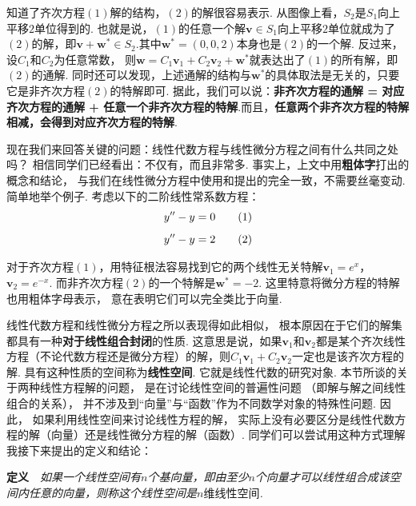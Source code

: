 知道了齐次方程$(1)$解的结构，$(2)$的解很容易表示.
从图像上看，$S_2$是$S_1$向上平移$2$单位得到的.
也就是说，$(1)$的任意一个解$\bm{v} \in S_1$向上平移$2$单位就成为了$(2)$的解，即$\bm{v} + \bm{w^{*}} \in S_2$.其中$\bm{w^{*}}=(0,0,2)$本身也是$(2)$的一个解.
反过来，设$C_1$和$C_2$为任意常数，
则$\bm{w} = C_1 \bm{v}_1 + C_2 \bm{v}_2 + \bm{w^{*}}$就表达出了$(1)$的所有解，即$(2)$的通解.
同时还可以发现，上述通解的结构与$\bm{w^{*}}$的具体取法是无关的，只要它是非齐次方程$(2)$的特解即可.
据此，我们可以说：\textbf{非齐次方程的通解 = 对应齐次方程的通解 + 任意一个非齐次方程的特解}.而且，\textbf{任意两个非齐次方程的特解相减，会得到对应齐次方程的特解}.\vspace{0.5em}

现在我们来回答关键的问题：线性代数方程与线性微分方程之间有什么共同之处吗？
相信同学们已经看出：不仅有，而且非常多.
事实上，上文中用\textbf{粗体字}打出的概念和结论，
与我们在线性微分方程中使用和提出的完全一致，不需要丝毫变动.
简单地举个例子. 考虑以下的二阶线性常系数方程：
\begin{equation}
    \setlength\abovedisplayskip{4pt}
    \setlength\belowdisplayskip{2pt}
    y'' - y = 0  \tag{1}
\end{equation}
\begin{equation}
    \setlength\abovedisplayskip{2pt}
    \setlength\belowdisplayskip{4pt}
    y'' - y = 2  \tag{2}
\end{equation}

对于齐次方程$(1)$，用特征根法容易找到它的两个线性无关特解$\bm{v}_1 = e^x$，$\bm{v}_2 = e^{-x}$.
而非齐次方程$(2)$的一个特解是$\bm{w^{*}} = -2$.
这里特意将微分方程的特解也用粗体字母表示，
意在表明它们可以完全类比于向量.

线性代数方程和线性微分方程之所以表现得如此相似，
根本原因在于它们的解集都具有一种\textbf{对于线性组合封闭}的性质.
这意思是说，如果$\bm{v}_1$和$\bm{v}_2$都是某个齐次线性方程（不论代数方程还是微分方程）的解，则$C_1 \bm{v}_1 + C_2 \bm{v}_2$一定也是该齐次方程的解.
具有这种性质的空间称为\textbf{线性空间}.
它就是线性代数的研究对象.
本节所谈的关于两种线性方程解的问题，
是在讨论线性空间的普遍性问题
（即解与解之间线性组合的关系），
并不涉及到“向量”与“函数”作为不同数学对象的特殊性问题.
因此，
如果利用线性空间来讨论线性方程的解，
实际上没有必要区分是线性代数方程的解（向量）还是线性微分方程的解（函数）.
同学们可以尝试用这种方式理解我接下来提出的定义和结论：\vspace{0.5em}

\textbf{定义}~~\textit{如果一个线性空间有$n$个基向量，即由至少$n$个向量才可以线性组合成该空间内任意的向量，则称这个线性空间是$\textbf{$n$维线性空间}$.}

